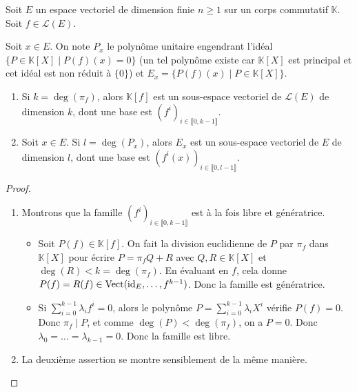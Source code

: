 





  Soit $E$ un espace vectoriel de dimension finie $n \geq 1$ sur un corps commutatif $\mathbb{K}$. Soit $f \in \mathcal{L}(E)$.

  \begin{notation}
    Soit $x \in E$. On note $P_x$ le polynôme unitaire engendrant l'idéal $\{ P \in \mathbb{K}[X] \mid P(f)(x) = 0 \}$ (un tel polynôme existe car $\mathbb{K}[X]$ est principal et cet idéal est non réduit à $\{ 0 \}$) et $E_x = \{ P(f)(x) \mid P \in \mathbb{K}[X] \}$.
  \end{notation}

  \begin{lemma}
    \label{invariants-de-similitude-1}
    \begin{enumerate}[label=(\roman*)]
      \item Si $k = \deg(\pi_f)$, alors $\mathbb{K}[f]$ est un sous-espace vectoriel de $\mathcal{L}(E)$ de dimension $k$, dont une base est $(f^i)_{i \in \llbracket 0, k-1 \rrbracket}$.
      \item Soit $x \in E$. Si $l = \deg(P_x)$, alors $E_x$ est un sous-espace vectoriel de $E$ de dimension $l$, dont une base est $(f^i(x))_{i \in \llbracket 0, l-1 \rrbracket}$.
    \end{enumerate}
  \end{lemma}


  \begin{proof}
    \begin{enumerate}[label=(\roman*)]
      \item Montrons que la famille $(f^i)_{i \in \llbracket 0, k-1 \rrbracket}$ est à la fois libre et génératrice.
      \begin{itemize}
        \item Soit $P(f) \in \mathbb{K}[f]$. On fait la division euclidienne de $P$ par $\pi_f$ dans $\mathbb{K}[X]$ pour écrire $P = \pi_f Q + R$ avec $Q, R \in \mathbb{K}[X]$ et $\deg(R) < k = \deg(\pi_f)$. En évaluant en $f$, cela donne $P(f) = R(f) \in \operatorname{Vect}(\operatorname{id}_E, \dots, f^{k-1})$. Donc la famille est génératrice.
        \item Si $\sum_{i=0}^{k-1} \lambda_i f^i = 0$, alors le polynôme $P = \sum_{i=0}^{k-1} \lambda_i X^i$ vérifie $P(f) = 0$. Donc $\pi_f \mid P$, et comme $\deg(P) < \deg(\pi_f)$, on a $P = 0$. Donc $\lambda_0 = \dots = \lambda_{k-1} = 0$. Donc la famille est libre.
      \end{itemize}
      \item La deuxième assertion se montre sensiblement de la même manière.
    \end{enumerate}
  \end{proof}

